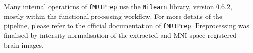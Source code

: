 \documentclass{article}
\begin{document}
Many internal operations of \texttt{fMRIPrep} use the
\texttt{Nilearn} library, version 0.6.2, %
mostly within the functional processing workflow.
For more details of the pipeline, please refer to \href{https://fMRIPrep.readthedocs.io/en/latest/workflows.html}{the official documentation of \texttt{fMRIPrep}}. Preprocessing was finalised by intensity normalisation of the extracted and MNI space registered brain images. %
\end{document}
